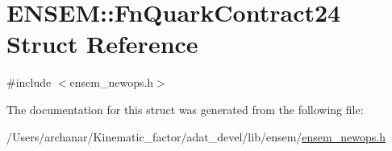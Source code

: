 \hypertarget{structENSEM_1_1FnQuarkContract24}{}\section{E\+N\+S\+EM\+:\+:Fn\+Quark\+Contract24 Struct Reference}
\label{structENSEM_1_1FnQuarkContract24}


{\ttfamily \#include $<$ensem\+\_\+newops.\+h$>$}



The documentation for this struct was generated from the following file\+:\begin{DoxyCompactItemize}
\item 
/\+Users/archanar/\+Kinematic\+\_\+factor/adat\+\_\+devel/lib/ensem/\mbox{\hyperlink{lib_2ensem_2ensem__newops_8h}{ensem\+\_\+newops.\+h}}\end{DoxyCompactItemize}
